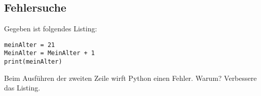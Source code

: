 \subsection{Fehlersuche}
Gegeben ist folgendes Listing:
\begin{lstlisting}
meinAlter = 21
MeinAlter = MeinAlter + 1
print(meinAlter)
\end{lstlisting}
Beim Ausführen der zweiten Zeile wirft Python einen Fehler. Warum? Verbessere das Listing.
